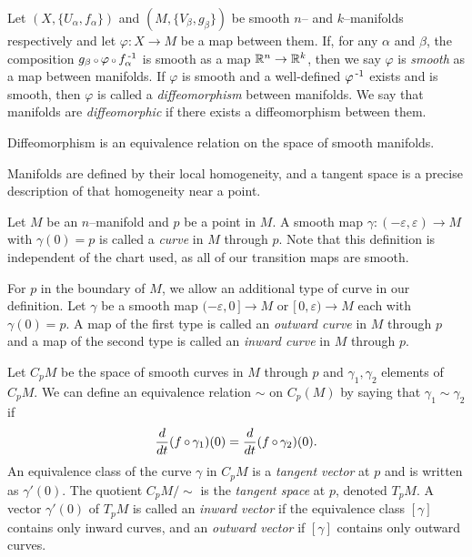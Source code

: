 \begin{defn}
	\label{def:smoothmap}
	Let $(X,\{U_\alpha,f_\alpha\})$ and $(M,\{V_\beta,g_\beta\})$ be smooth $n$-- and $k$--manifolds respectively and let $\varphi:X\to M$ be a map between them.
	If, for any $\alpha$ and $\beta$, the composition $g_\beta\comp \varphi\comp f_\alpha\inv$ is smooth as a map $\mathbb{R}^n\to\mathbb{R}^k$, then we say $\varphi$ is \emph{smooth} as a map between manifolds.
	If $\varphi$ is smooth and a well-defined $\varphi^{\,\text{-}1}$ exists and is smooth, then $\varphi$ is called a \emph{diffeomorphism} between manifolds.
	We say that manifolds are \emph{diffeomorphic} if there exists a diffeomorphism between them.
\end{defn}

\begin{prop}
	\label{prop:diffeoequiv}
	Diffeomorphism is an equivalence relation on the space of smooth manifolds.
\end{prop}

Manifolds are defined by their local homogeneity, and a tangent space is a precise description of that homogeneity near a point.

\begin{defn}
	\label{def:tangentspace}
	Let $M$ be an $n$--manifold and $p$ be a point in $M$.
	A smooth map $\gamma:(-\varepsilon,\varepsilon)\to M$ with $\gamma(0)=p$ is called a \emph{curve} in $M$ through $p$.
	Note that this definition is independent of the chart used, as all of our transition maps are smooth.
	
	For $p$ in the boundary of $M$, we allow an additional type of curve in our definition.
	Let $\gamma$ be a smooth map $(-\varepsilon,0\,] \to M$ or $[\,0,\varepsilon) \to M$ each with $\gamma(0)=p$.
	A map of the first type is called an \emph{outward curve} in $M$ through $p$ and a map of the second type is called an \emph{inward curve} in $M$ through $p$.
	
	Let $C_p M$ be the space of smooth curves in $M$ through $p$ and $\gamma_1, \gamma_2$ elements of $C_p M$.
	We can define an equivalence relation $\sim$ on $C_p(M)$ by saying that $\gamma_1\sim\gamma_2$ if
	\[
		\Ddt(f\comp\gamma_1)(0) = \Ddt(f\comp\gamma_2)(0).
	\]
	An equivalence class of the curve $\gamma$ in $C_p M$ is a \emph{tangent vector} at $p$ and is written as $\gamma'(0)$.
	The quotient $C_p M/\sim$ is the \emph{tangent space} at $p$, denoted $T_p M$.
	A vector $\gamma'(0)$ of $T_p M$ is called an \emph{inward vector} if the equivalence class $[\gamma]$ contains only inward curves, and an \emph{outward vector} if $[\gamma]$ contains only outward curves.
\end{defn}

